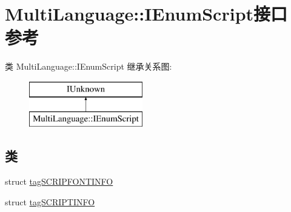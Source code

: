 \hypertarget{interface_multi_language_1_1_i_enum_script}{}\section{Multi\+Language\+:\+:I\+Enum\+Script接口 参考}
\label{interface_multi_language_1_1_i_enum_script}
类 Multi\+Language\+:\+:I\+Enum\+Script 继承关系图\+:\begin{figure}[H]
\begin{center}
\leavevmode
\includegraphics[height=2.000000cm]{interface_multi_language_1_1_i_enum_script}
\end{center}
\end{figure}
\subsection*{类}
\begin{DoxyCompactItemize}
\item 
struct \hyperlink{struct_multi_language_1_1_i_enum_script_1_1tag_s_c_r_i_p_f_o_n_t_i_n_f_o}{tag\+S\+C\+R\+I\+P\+F\+O\+N\+T\+I\+N\+FO}
\item 
struct \hyperlink{struct_multi_language_1_1_i_enum_script_1_1tag_s_c_r_i_p_t_i_n_f_o}{tag\+S\+C\+R\+I\+P\+T\+I\+N\+FO}
\end{DoxyCompactItemize}
